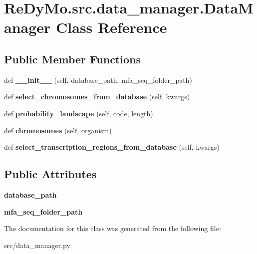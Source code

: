 \hypertarget{classReDyMo_1_1src_1_1data__manager_1_1DataManager}{}\section{Re\+Dy\+Mo.\+src.\+data\+\_\+manager.\+Data\+Manager Class Reference}
\label{classReDyMo_1_1src_1_1data__manager_1_1DataManager}
\subsection*{Public Member Functions}
\begin{DoxyCompactItemize}
\item 
\mbox{\label{classReDyMo_1_1src_1_1data__manager_1_1DataManager_a27b99e0e717df27a816eb1d2db550847}} 
def {\bfseries \+\_\+\+\_\+init\+\_\+\+\_\+} (self, database\+\_\+path, mfa\+\_\+seq\+\_\+folder\+\_\+path)
\item 
\mbox{\label{classReDyMo_1_1src_1_1data__manager_1_1DataManager_afc9590b6ec6ab95c33bfa2f44b0da404}} 
def {\bfseries select\+\_\+chromosomes\+\_\+from\+\_\+database} (self, kwargs)
\item 
\mbox{\label{classReDyMo_1_1src_1_1data__manager_1_1DataManager_ac8933073eed38e7669e162884d89cda8}} 
def {\bfseries probability\+\_\+landscape} (self, code, length)
\item 
\mbox{\label{classReDyMo_1_1src_1_1data__manager_1_1DataManager_ae36fd09e981be096578336def0a04069}} 
def {\bfseries chromosomes} (self, organism)
\item 
\mbox{\label{classReDyMo_1_1src_1_1data__manager_1_1DataManager_acfb4a6c0196739c8afc556269ce9ab47}} 
def {\bfseries select\+\_\+transcription\+\_\+regions\+\_\+from\+\_\+database} (self, kwargs)
\end{DoxyCompactItemize}
\subsection*{Public Attributes}
\begin{DoxyCompactItemize}
\item 
\mbox{\label{classReDyMo_1_1src_1_1data__manager_1_1DataManager_a2b02f39a632fbbc2c5b6de552ca83272}} 
{\bfseries database\+\_\+path}
\item 
\mbox{\label{classReDyMo_1_1src_1_1data__manager_1_1DataManager_ad2ca521773db409a2e8032c788970b4f}} 
{\bfseries mfa\+\_\+seq\+\_\+folder\+\_\+path}
\end{DoxyCompactItemize}


The documentation for this class was generated from the following file\+:\begin{DoxyCompactItemize}
\item 
src/data\+\_\+manager.\+py\end{DoxyCompactItemize}
